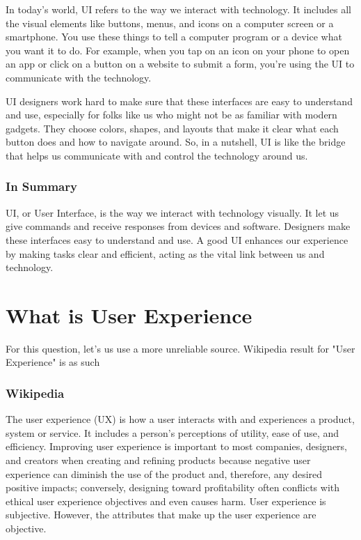 \documentclass[12pt,titlepage]{article}
\begin{document}
In today's world, UI refers to the way we interact with technology. It includes all the visual elements like buttons, menus, and icons on a computer screen or a smartphone. You use these things to tell a computer program or a device what you want it to do. For example, when you tap on an icon on your phone to open an app or click on a button on a website to submit a form, you're using the UI to communicate with the technology.

UI designers work hard to make sure that these interfaces are easy to understand and use, especially for folks like us who might not be as familiar with modern gadgets. They choose colors, shapes, and layouts that make it clear what each button does and how to navigate around. So, in a nutshell, UI is like the bridge that helps us communicate with and control the technology around us.

\subsubsection*{In Summary}
UI, or User Interface, is the way we interact with technology visually. It let us give commands and receive responses from devices and software. Designers make these interfaces easy to understand and use. A good UI enhances our experience by making tasks clear and efficient, acting as the vital link between us and technology.

\newpage

\section{What is User Experience}
For this question, let's us use a more unreliable source. Wikipedia result for "User Experience" is as such

\subsubsection*{Wikipedia}
The user experience (UX) is how a user interacts with and experiences a product, system or service. It includes a person's perceptions of utility, ease of use, and efficiency. Improving user experience is important to most companies, designers, and creators when creating and refining products because negative user experience can diminish the use of the product and, therefore, any desired positive impacts; conversely, designing toward profitability often conflicts with ethical user experience objectives and even causes harm. User experience is subjective. However, the attributes that make up the user experience are objective.
\end{document}

